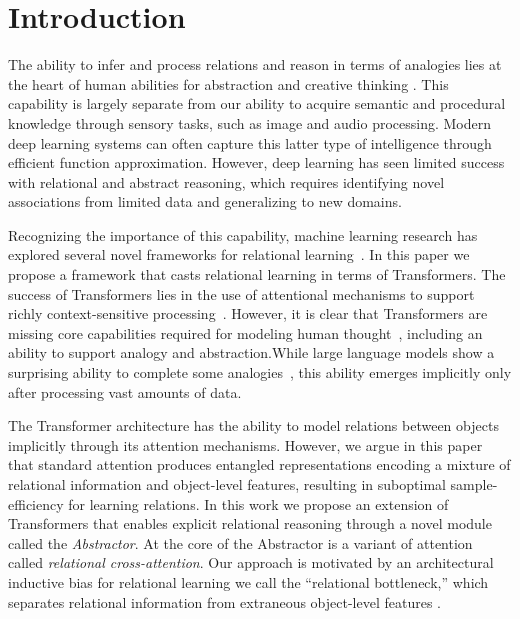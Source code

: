 \section{Introduction}

The ability to infer and process relations and reason in terms of analogies lies at the heart of human abilities for abstraction and creative thinking
\citep{snow,holyoak}. This capability is largely separate from our ability to acquire semantic and procedural knowledge through sensory tasks, such as image and audio processing. Modern deep learning systems can often capture this latter type of intelligence through efficient function approximation. However, deep learning has seen limited success with relational and abstract reasoning, which requires identifying novel associations from limited data and generalizing to new domains.

Recognizing the importance of this capability, machine learning research has explored several novel frameworks for relational learning~\citep{NTM, episodicControl, TEM,shanahanExplicitlyRelationalNeural,esbn,mondal23learned,battaglia,barrett:2018,santoro1}. In this paper we propose a framework that casts relational learning in terms of Transformers. The success of Transformers lies in the use of attentional mechanisms to support richly context-sensitive processing~\citep{vaswani2017attention,transformers,kerg2020untangling}. However, it is clear that Transformers are missing core capabilities required for modeling human thought~\citep{mahowald2023dissociating}, including an ability to support analogy and abstraction.While large language models show a surprising ability to complete some analogies~\citep{webb2023emergent}, this ability emerges implicitly only after processing vast amounts of data.

The Transformer architecture has the ability to model relations between objects implicitly through its attention mechanisms. However, we argue in this paper that standard attention produces entangled representations encoding a mixture of relational information and object-level features, resulting in suboptimal sample-efficiency for learning relations.
In this work we propose an extension of Transformers that enables explicit relational reasoning through a novel module called the \textit{Abstractor}. At the core of the Abstractor is a variant of attention called \textit{relational cross-attention}. Our approach is motivated by an architectural inductive bias for relational learning we call the ``relational bottleneck,'' which separates relational information from extraneous object-level features \citep[see][for a cognitive science perspective]{webb2024relational}.

